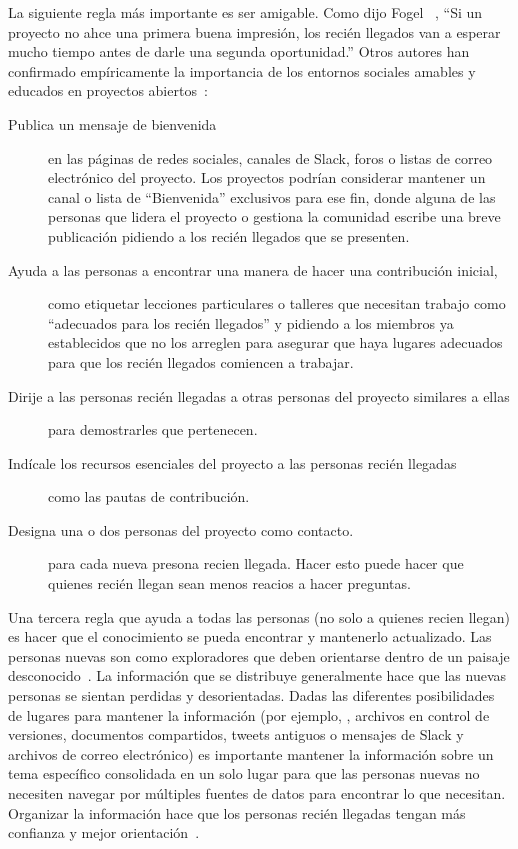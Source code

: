 La siguiente regla más importante es ser amigable.
Como dijo Fogel ~\cite{Foge2005},
``Si un proyecto no ahce una primera buena impresión,
los recién llegados van a esperar mucho tiempo antes de darle una segunda oportunidad.''
Otros autores han confirmado empíricamente la importancia de los entornos sociales amables y educados
en proyectos abiertos~\cite{Sing2012,Stei2013,Stei2018}:

\begin{description}

\item[Publica un mensaje de bienvenida]
  en las páginas de redes sociales, canales de Slack, foros o listas de correo electrónico del proyecto.
  Los proyectos podrían considerar mantener un canal o lista de ``Bienvenida'' exclusivos para ese fin,
  donde alguna de las personas que lidera el proyecto o gestiona la comunidad escribe una breve publicación pidiendo a los recién llegados que se presenten.

\item[Ayuda a las personas a encontrar una manera de hacer una contribución inicial,]
  como etiquetar lecciones particulares o talleres que necesitan trabajo como ``adecuados para los recién llegados''
  y pidiendo a los miembros ya establecidos que no los arreglen
  para asegurar que haya lugares adecuados para que los recién llegados comiencen a trabajar.

\item[Dirije a las personas recién llegadas a otras personas del proyecto similares a ellas]
  para demostrarles que pertenecen.

\item[Indícale los recursos esenciales del proyecto a las personas recién llegadas]
  como las pautas de contribución.

\item[Designa una o dos personas del proyecto como contacto.]
  para cada nueva presona recien llegada.
  Hacer esto puede hacer que quienes recién llegan sean menos reacios a hacer preguntas.

\end{description}

Una tercera regla que ayuda a todas las personas (no solo a quienes recien llegan)
es hacer que el conocimiento se pueda encontrar y mantenerlo actualizado.
Las personas nuevas son como exploradores que deben orientarse dentro de un paisaje desconocido~\cite{Dage2010}.
La información que se distribuye generalmente hace que las nuevas personas se sientan perdidas y desorientadas.
Dadas las diferentes posibilidades de lugares para mantener la información
(por ejemplo, \wikis, archivos en control de versiones, documentos compartidos, tweets antiguos o mensajes de Slack y archivos de correo electrónico)
es importante mantener la información sobre un tema específico consolidada en un solo lugar
para que las personas nuevas no necesiten navegar por múltiples fuentes de datos para encontrar lo que necesitan.
Organizar la información hace que los personas recién llegadas tengan más confianza y mejor orientación~\cite{Stei2016}.

